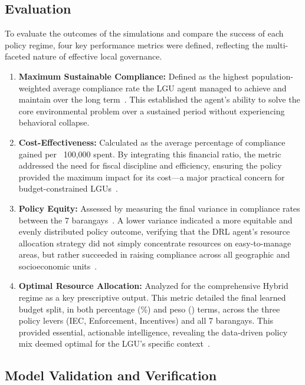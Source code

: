 \subsection{Evaluation}
To evaluate the outcomes of the simulations and compare the success of each policy regime, four key performance metrics were defined, reflecting the multi-faceted nature of effective local governance.

\begin{enumerate}
    \item \textbf{Maximum Sustainable Compliance:} Defined as the highest population-weighted average compliance rate the LGU agent managed to achieve and maintain over the long term~\citep{ApostolJamoralin2024, Torkayesh2021}. This established the agent's ability to solve the core environmental problem over a sustained period without experiencing behavioral collapse.
    \item \textbf{Cost-Effectiveness:} Calculated as the average percentage of compliance gained per \textpeso~100,000 spent. By integrating this financial ratio, the metric addressed the need for fiscal discipline and efficiency, ensuring the policy provided the maximum impact for its cost---a major practical concern for budget-constrained LGUs~\citep{MedinaMijangos2020, WorldBank2022}.
    \item \textbf{Policy Equity:} Assessed by measuring the final variance in compliance rates between the 7 barangays~\citep{Jimenez2025}. A lower variance indicated a more equitable and evenly distributed policy outcome, verifying that the DRL agent's resource allocation strategy did not simply concentrate resources on easy-to-manage areas, but rather succeeded in raising compliance across all geographic and socioeconomic units~\citep{TianReview2024}.
    \item \textbf{Optimal Resource Allocation:} Analyzed for the comprehensive Hybrid regime as a key prescriptive output. This metric detailed the final learned budget split, in both percentage (\%) and peso (\textpeso) terms, across the three policy levers (IEC, Enforcement, Incentives) and all 7 barangays. This provided essential, actionable intelligence, revealing the data-driven policy mix deemed optimal for the LGU's specific context~\citep{MuZhang2021, Zhao2022}.
\end{enumerate}

\subsection{Model Validation and Verification}
\setlength{\parindent}{2em}

